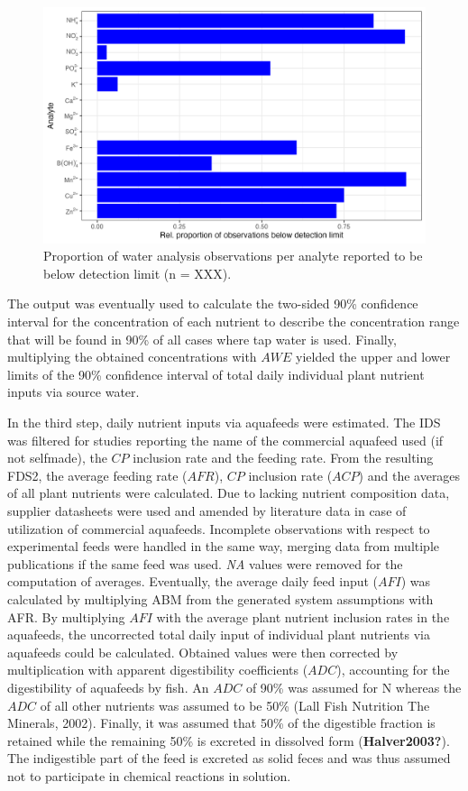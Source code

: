 \documentclass[
]{article}
\begin{document}
\begin{figure}
\centering
\includegraphics{plots/contribution_waterData_belowLimit.png}
\caption{Proportion of water analysis observations per analyte reported to be below detection limit (n = XXX).}
\end{figure}

The output was eventually used to calculate the two-sided 90\% confidence interval for the concentration of each nutrient to describe the concentration range that will be found in 90\% of all cases where tap water is used.
Finally, multiplying the obtained concentrations with \(AWE\) yielded the upper and lower limits of the 90\% confidence interval of total daily individual plant nutrient inputs via source water.

In the third step, daily nutrient inputs via aquafeeds were estimated. The IDS was filtered for studies reporting the name of the commercial aquafeed used (if not selfmade), the \(CP\) inclusion rate and the feeding rate. From the resulting FDS2, the average feeding rate (\(AFR\)), \(CP\) inclusion rate (\(ACP\)) and the averages of all plant nutrients were calculated. Due to lacking nutrient composition data, supplier datasheets were used and amended by literature data in case of utilization of commercial aquafeeds. Incomplete observations with respect to experimental feeds were handled in the same way, merging data from multiple publications if the same feed was used. \emph{NA} values were removed for the computation of averages.
Eventually, the average daily feed input (\(AFI\)) was calculated by multiplying ABM from the generated system assumptions with AFR. By multiplying \(AFI\) with the average plant nutrient inclusion rates in the aquafeeds, the uncorrected total daily input of individual plant nutrients via aquafeeds could be calculated. Obtained values were then corrected by multiplication with apparent digestibility coefficients (\(ADC\)), accounting for the digestibility of aquafeeds by fish. An \(ADC\) of 90\% was assumed for N whereas the \(ADC\) of all other nutrients was assumed to be 50\% (Lall Fish Nutrition The Minerals, 2002). Finally, it was assumed that 50\% of the digestible fraction is retained while the remaining 50\% is excreted in dissolved form (\textbf{Halver2003?}). The indigestible part of the feed is excreted as solid feces and was thus assumed not to participate in chemical reactions in solution.
\end{document}
